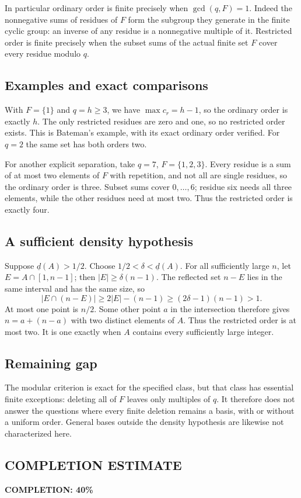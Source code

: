 In particular ordinary order is finite precisely when $\gcd(q,F)=1$. Indeed the nonnegative sums of residues of $F$ form the subgroup they generate in the finite cyclic group: an inverse of any residue is a nonnegative multiple of it. Restricted order is finite precisely when the subset sums of the actual finite set $F$ cover every residue modulo $q$.

\subsection*{Examples and exact comparisons}
With $F=\{1\}$ and $q=h\ge3$, we have $\max c_r=h-1$, so the ordinary order is exactly $h$. The only restricted residues are zero and one, so no restricted order exists. This is Bateman's example, with its exact ordinary order verified. For $q=2$ the same set has both orders two.

For another explicit separation, take $q=7$, $F=\{1,2,3\}$. Every residue is a sum of at most two elements of $F$ with repetition, and not all are single residues, so the ordinary order is three. Subset sums cover $0,\ldots,6$; residue six needs all three elements, while the other residues need at most two. Thus the restricted order is exactly four.

\subsection*{A sufficient density hypothesis}
Suppose $\underline d(A)>1/2$. Choose $1/2<\delta<\underline d(A)$. For all sufficiently large $n$, let $E=A\cap[1,n-1]$; then $|E|\ge\delta(n-1)$. The reflected set $n-E$ lies in the same interval and has the same size, so
\[
 |E\cap(n-E)|\ge2|E|-(n-1)\ge(2\delta-1)(n-1)>1.
\]
At most one point is $n/2$. Some other point $a$ in the intersection therefore gives $n=a+(n-a)$ with two distinct elements of $A$. Thus the restricted order is at most two. It is one exactly when $A$ contains every sufficiently large integer.

\subsection*{Remaining gap}
The modular criterion is exact for the specified class, but that class has essential finite exceptions: deleting all of $F$ leaves only multiples of $q$. It therefore does not answer the questions where every finite deletion remains a basis, with or without a uniform order. General bases outside the density hypothesis are likewise not characterized here.
\subsection*{COMPLETION ESTIMATE}
\textbf{COMPLETION: 40\%}

